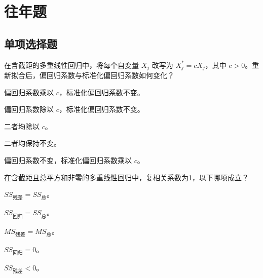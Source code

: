 \par\addvspace{8pt}\noindent\begin{minipage}{\linewidth}

\section{往年题}

\subsection{单项选择题}


在含截距的多重线性回归中，将每个自变量 \(X_j\) 改写为 \(X_j^*=cX_j\)，其中 \(c>0\)。重新拟合后，偏回归系数与标准化偏回归系数如何变化？


\begin{choices}

\item 偏回归系数乘以 \(c\)，标准化偏回归系数不变。

\item 偏回归系数除以 \(c\)，标准化偏回归系数不变。

\item 二者均除以 \(c\)。

\item 二者均保持不变。

\item 偏回归系数不变，标准化偏回归系数乘以 \(c\)。

\end{choices}

\end{minipage}\par\vspace{5pt}

\par\addvspace{8pt}\noindent\begin{minipage}{\linewidth}


在含截距且总平方和非零的多重线性回归中，复相关系数为1，以下哪项成立？


\begin{choices}

\item \(SS_{\text{残差}}=SS_{\text{总}}\)。

\item \(SS_{\text{回归}}=SS_{\text{总}}\)。

\item \(MS_{\text{残差}}=MS_{\text{总}}\)。

\item \(SS_{\text{回归}}=0\)。

\item \(SS_{\text{残差}}<0\)。

\end{choices}

\end{minipage}\par\vspace{5pt}

